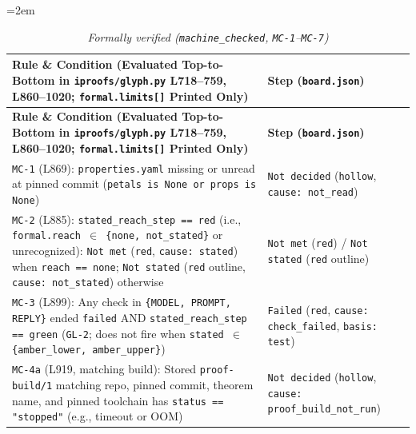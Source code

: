 \documentclass[11pt,letterpaper]{article}
\begin{document}
{\footnotesize\setlength{\tabcolsep}{4pt}\emergencystretch=2em
\begin{longtable}{@{}>{\raggedright\arraybackslash}p{} >{\raggedright\arraybackslash}p{}@{}}
\caption{\textit{Formally verified (\texttt{machine\_\allowbreak{}checked}, \texttt{MC-1}--\texttt{MC-7})}} \\
\toprule
\textbf{Rule \& Condition (Evaluated Top-to-Bottom in \texttt{iproofs/\allowbreak{}glyph.\allowbreak{}py} L718--759, L860--1020; \texttt{formal.\allowbreak{}limits[]} Printed Only)} & \textbf{Step (\texttt{board.\allowbreak{}json})} \\
\midrule
\endfirsthead
\toprule
\textbf{Rule \& Condition (Evaluated Top-to-Bottom in \texttt{iproofs/\allowbreak{}glyph.\allowbreak{}py} L718--759, L860--1020; \texttt{formal.\allowbreak{}limits[]} Printed Only)} & \textbf{Step (\texttt{board.\allowbreak{}json})} \\
\midrule
\endhead
\bottomrule
\endfoot
\texttt{MC-1} (L869): \texttt{properties.\allowbreak{}yaml} missing or unread at pinned commit (\texttt{petals is None or props is None}) & \texttt{Not decided} (\texttt{hollow}, \texttt{cause: not\_\allowbreak{}read}) \\
\texttt{MC-2} (L885): \texttt{stated\_\allowbreak{}reach\_\allowbreak{}step == red} (i.e., \texttt{formal.\allowbreak{}reach $\in$ \{none, not\_\allowbreak{}stated\}} or unrecognized): \texttt{Not met} (\texttt{red}, \texttt{cause: stated}) when \texttt{reach == none}; \texttt{Not stated} (\texttt{red} outline, \texttt{cause: not\_\allowbreak{}stated}) otherwise & \texttt{Not met} (\texttt{red}) / \texttt{Not stated} (\texttt{red} outline) \\
\texttt{MC-3} (L899): Any check in \texttt{\{MODEL, PROMPT, REPLY\}} ended \texttt{failed} AND \texttt{stated\_\allowbreak{}reach\_\allowbreak{}step == green} (\texttt{GL-2}; does not fire when \texttt{stated $\in$ \{amber\_\allowbreak{}lower, amber\_\allowbreak{}upper\}}) & \texttt{Failed} (\texttt{red}, \texttt{cause: check\_\allowbreak{}failed}, \texttt{basis: test}) \\
\texttt{MC-4a} (L919, matching build): Stored \texttt{proof-\allowbreak{}build/\allowbreak{}1} matching repo, pinned commit, theorem name, and pinned toolchain has \texttt{status == "stopped"} (e.g., timeout or OOM) & \texttt{Not decided} (\texttt{hollow}, \texttt{cause: proof\_\allowbreak{}build\_\allowbreak{}not\_\allowbreak{}run}) \\

\end{longtable}}
\end{document}
